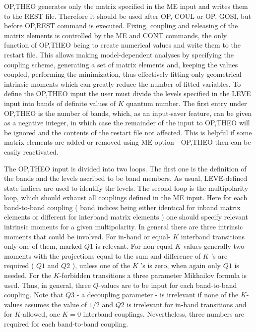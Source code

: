 \documentclass[10pt]{article}
\begin{document}
OP,THEO generates only the matrix specified in the ME input and writes them to the REST file. Therefore it should be used after OP, COUL or OP, GOSI, but before OP,REST command is executed. Fixing, coupling and releasing of the matrix elements is controlled by the ME and CONT commands, the only function of OP,THEO being to create numerical values and write them to the restart file. This allows making model-dependent analyses by specifying the coupling scheme, generating a set of matrix elements and, keeping the values coupled, performing the minimization, thus effectively fitting only geometrical intrinsic moments which can greatly reduce the number of fitted variables. To define the OP,THEO input the user must divide the levels specified in the LEVE input into bands of definite values of $K$ quantum number. The first entry under OP,THEO is the number of bands, which, as an input-saver feature, can be given as a negative integer, in which case the remainder of the input to OP,THEO will be ignored and the contents of the restart file not affected. This is helpful if some matrix elements are added or removed using ME option - OP,THEO then can be easily reactivated.

The OP,THEO input is divided into two loops. The first one is the definition of the bands and the levels ascribed to be band members. As usual, LEVE-defined state indices are used to identify the levels. The second loop is the multipolarity loop, which should exhaust all couplings defined in the ME input. Here for each band-to-band coupling ( band indices being either identical for inband matrix elements or different for interband matrix elements ) one should specify relevant intrinsic moments for a given multipolarity. In general there are three intrinsic moments that could be involved. For in-band or equal- $K$ interband transitions only one of them, marked $Q 1$ is relevant. For non-equal $K$ values generally two moments with the projections equal to the sum and difference of $K$ 's are required ( $Q 1$ and $Q 2$ ), unless one of the $K$ 's is zero, when again only $Q 1$ is needed. For the $K$-forbidden transitions a three parameter Mikhailov formula is used. Thus, in general, three $Q$-values are to be input for each band-to-band coupling. Note that $Q 3$ - a decoupling parameter - is irrelevant if none of the $K$-values assumes the value of $1 / 2$ and $Q 2$ is irrelevant for in-band transitions and for $K$-allowed, one $K=0$ interband couplings. Nevertheless, three numbers are required for each band-to-band coupling.
\end{document}
